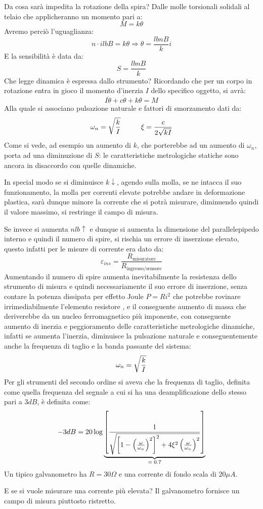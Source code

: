 \documentclass[a4paper, 15pt]{article}
\begin{document}
\begin{adjustwidth}{2in}{}
		Da cosa sarà impedita la rotazione della spira? Dalle molle torsionali solidali al telaio che applicheranno un momento pari a: 
		\[M=k\theta\]
		Avremo perciò l'uguaglianza: 
		\[ n\cdot ilbB = k\theta \Rightarrow \theta = \dfrac{lbnB}{k}i\]
		E la sensibilità è data da:
		\[ S = \dfrac{lbnB}{k} \]
		Che legge dinamica è espressa dallo strumento? Ricordando che per un corpo in rotazione entra in gioco il momento d'inerzia $I$ dello specifico oggetto, si avrà:
		\[I\ddot{\theta} + c\dot{\theta} + k\theta = M\]
		Alla quale si associano pulsazione naturale e fattori di smorzamento dati da: 
		\[ \omega_n = \sqrt{k\over I} \hspace{1cm} \xi = \dfrac{c}{2\sqrt{kI}}\]
		Come si vede, ad esempio un aumento di $k$, che porterebbe ad un aumento di $\omega_n$, porta ad una diminuzione di $S$: le caratteristiche metrologiche statiche sono ancora in disaccordo con quelle dinamiche. \newline 
		
		In special modo se si diminuisce $k\downarrow$, agendo sulla molla, se ne intacca il suo funzionamento, la molla per correnti elevate potrebbe andare in deformazione plastica, sarà dunque minore la corrente che si potrà misurare, diminuendo quindi il valore massimo, si restringe il campo di misura. \newline
		
		Se invece si aumenta $ nlb\uparrow $ e dunque si aumenta la dimensione del parallelepipedo interno e quindi il numero di spire, si rischia un errore di inserzione elevato, questo infatti per le misure di corrente era dato da: 
		\[\varepsilon_{ins} = \dfrac{R_{\text{misuratore}}}{R_{\text{ingresso/sensore}}}\]
		Aumentando il numero di spire aumenta inevitabilmente la resistenza dello strumento di misura e quindi necessariamente il suo errore di inserzione, senza contare la potenza dissipata per effetto Joule $P=Ri^2$ che potrebbe rovinare irrimediabilmente l'elemento resistore , e il conseguente aumento di massa che deriverebbe da un nucleo ferromagnetico più imponente, con conseguente aumento di inerzia e peggioramento delle caratteristiche metrologiche dinamiche, infatti se aumenta l'inerzia, diminuisce la pulsazione naturale e conseguentemente anche la frequenza di taglio e la banda passante del sistema:
		\[\omega_n = \sqrt{k\over I} \] 
		Per gli strumenti del secondo ordine si aveva che la frequenza di taglio, definita come quella frequenza del segnale a cui si ha una deamplificazione dello stesso pari a $3 dB$, è definita come:
		\[  -3dB = 20\log\underbrace{\left[ \dfrac{1}{\sqrt{\left[1- \left(\omega\over\omega_n\right)^2\right]^2 + 4\xi^2\left(\omega\over\omega_n\right)^2}}\right]}_\text{$=0.7$}\]
		Un tipico galvanometro ha $R=30\Omega$ e una corrente di fondo scala di $20\mu A$. 
		
		E se si vuole misurare una corrente più elevata? Il galvanometro fornisce un campo di misura piuttosto ristretto.
\end{adjustwidth}
\newpage		
\end{document}
